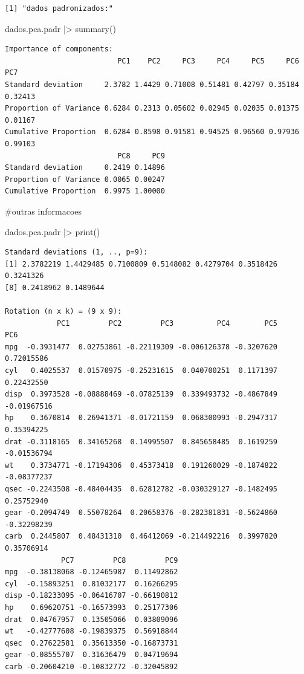 \documentclass[
  letterpaper,
  DIV=11,
  numbers=noendperiod]{scrreprt}
\newenvironment{Shaded}{\begin{snugshade}}{\end{snugshade}}
\newcommand{\CommentTok}[1]{\textcolor[rgb]{0.37,0.37,0.37}{#1}}
\newcommand{\FunctionTok}[1]{\textcolor[rgb]{0.28,0.35,0.67}{#1}}
\newcommand{\NormalTok}[1]{\textcolor[rgb]{0.00,0.23,0.31}{#1}}
\newcommand{\SpecialCharTok}[1]{\textcolor[rgb]{0.37,0.37,0.37}{#1}}
\begin{document}
\begin{verbatim}
[1] "dados padronizados:"
\end{verbatim}

\begin{Shaded}
\begin{Highlighting}[]
\NormalTok{dados.pca.padr }\SpecialCharTok{|\textgreater{}} \FunctionTok{summary}\NormalTok{()}
\end{Highlighting}
\end{Shaded}

\begin{verbatim}
Importance of components:
                          PC1    PC2     PC3     PC4     PC5     PC6     PC7
Standard deviation     2.3782 1.4429 0.71008 0.51481 0.42797 0.35184 0.32413
Proportion of Variance 0.6284 0.2313 0.05602 0.02945 0.02035 0.01375 0.01167
Cumulative Proportion  0.6284 0.8598 0.91581 0.94525 0.96560 0.97936 0.99103
                          PC8     PC9
Standard deviation     0.2419 0.14896
Proportion of Variance 0.0065 0.00247
Cumulative Proportion  0.9975 1.00000
\end{verbatim}

\begin{Shaded}
\begin{Highlighting}[]
\CommentTok{\#outras informacoes}

\NormalTok{dados.pca.padr }\SpecialCharTok{|\textgreater{}} \FunctionTok{print}\NormalTok{()}
\end{Highlighting}
\end{Shaded}

\begin{verbatim}
Standard deviations (1, .., p=9):
[1] 2.3782219 1.4429485 0.7100809 0.5148082 0.4279704 0.3518426 0.3241326
[8] 0.2418962 0.1489644

Rotation (n x k) = (9 x 9):
            PC1         PC2         PC3          PC4        PC5         PC6
mpg  -0.3931477  0.02753861 -0.22119309 -0.006126378 -0.3207620  0.72015586
cyl   0.4025537  0.01570975 -0.25231615  0.040700251  0.1171397  0.22432550
disp  0.3973528 -0.08888469 -0.07825139  0.339493732 -0.4867849 -0.01967516
hp    0.3670814  0.26941371 -0.01721159  0.068300993 -0.2947317  0.35394225
drat -0.3118165  0.34165268  0.14995507  0.845658485  0.1619259 -0.01536794
wt    0.3734771 -0.17194306  0.45373418  0.191260029 -0.1874822 -0.08377237
qsec -0.2243508 -0.48404435  0.62812782 -0.030329127 -0.1482495  0.25752940
gear -0.2094749  0.55078264  0.20658376 -0.282381831 -0.5624860 -0.32298239
carb  0.2445807  0.48431310  0.46412069 -0.214492216  0.3997820  0.35706914
             PC7         PC8         PC9
mpg  -0.38138068 -0.12465987  0.11492862
cyl  -0.15893251  0.81032177  0.16266295
disp -0.18233095 -0.06416707 -0.66190812
hp    0.69620751 -0.16573993  0.25177306
drat  0.04767957  0.13505066  0.03809096
wt   -0.42777608 -0.19839375  0.56918844
qsec  0.27622581  0.35613350 -0.16873731
gear -0.08555707  0.31636479  0.04719694
carb -0.20604210 -0.10832772 -0.32045892
\end{verbatim}
\end{document}
